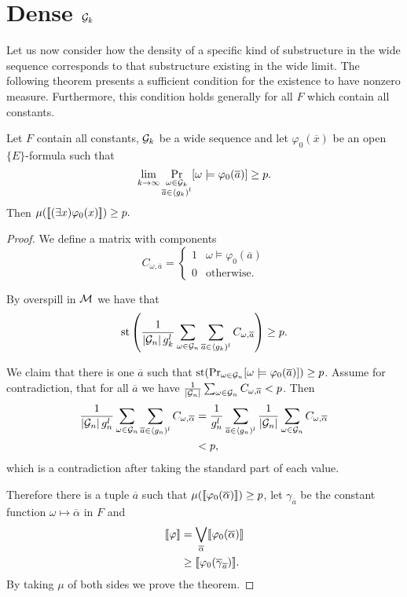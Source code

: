 \section{Dense \texorpdfstring{$\mathcal{G}_k$}{Gk}}

Let us now consider how the density of a specific kind of substructure in the wide sequence corresponds to that substructure existing in the wide limit. The following theorem presents a sufficient condition for the existence to have nonzero measure. Furthermore, this condition holds generally for all $F$ which contain all constants.

\begin{thrm}\label{thrmexists}
Let $F$ contain all constants, $\mathcal{G}_k$ be a wide sequence and let $\varphi_0(\overline x)$ be an open $\{E\}$-formula such that
\[\lim_{k\to\infty}\Pr_{\substack{\omega\in\mathcal{G}_k\\\overline a \in \langle g_k)^l}}[\omega\models\varphi_0(\overline a)]\geq p.\]
Then $\mu([\![(\exists x)\varphi_0(x)]\!])\geq p.$
\end{thrm}

\begin{proof}
We define a matrix with components 
\[C_{\omega,\overline a}=\begin{cases}1&\omega\models\varphi_0(\overline a)\\0&\text{otherwise}.\end{cases}\]

By overspill in $\mathcal{M}$ we have that
\[\text{st}\left (\frac{1}{\left|{\mathcal{G}_n}\right|g_k^l}\sum_{\omega\in\mathcal{G}_n}\sum_{\overline a \in \langle g_k)^l}C_{\omega,\overline a}\right )\geq p.\]

We claim that there is one $\overline a$ such that $\text{st}(\Pr_{\omega\in\mathcal{G}_n}[\omega\models\varphi_0(\overline a)])\geq p$. Assume for contradiction, that for all $\overline a$ we have $\frac{1}{\left|{\mathcal{G}_n}\right|}\sum_{\omega\in \mathcal{G}_n}C_{\omega,\overline a}<p$. Then
\begin{align}
\frac{1}{\left|{\mathcal{G}_n}\right|g_n^l}\sum_{\omega\in\mathcal{G}_n}\sum_{\overline a \in \langle g_n)^l}C_{\omega,\overline \alpha}&=
\frac{1}{g_n^l}\sum_{\overline a\in\langle g_n)^l}\frac{1}{\left|{\mathcal{G}_n}\right|}\sum_{\omega\in\mathcal{G}_n}C_{\omega,\overline \alpha}\\
&< p,
\end{align}
which is a contradiction after taking the standard part of each value.

Therefore there is a tuple $\overline a$ such that $\mu([\![\varphi_0(\overline\alpha)]\!])\geq p$, let $\gamma_{\overline a}$ be the constant function $\omega \mapsto \overline \alpha$ in $F$ and
\begin{align}
[\![\varphi]\!]&=\bigvee_{\overline\alpha}[\![\varphi_0(\overline\alpha)]\!]\\
&\geq [\![\varphi_0(\overline \gamma_{\overline a})]\!].
\end{align}
By taking $\mu$ of both sides we prove the theorem.
\end{proof}

